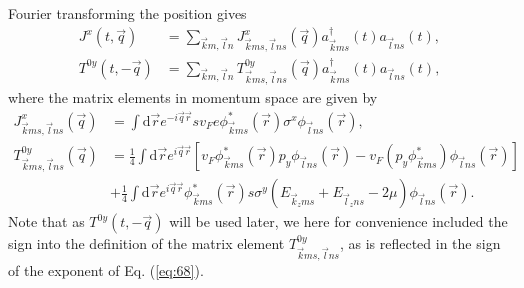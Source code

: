 Fourier transforming the position gives
\begin{align}
  \label{eq:66}
  J^x(t, \vec{q}) &= \sum\limits_{\vec{k}m, \vec{l}n}
                    J^x_{\vec{k}ms, \vec{l}ns}(\vec{q})
                    a^{\dagger}_{\vec{k}ms}(t)
                    a_{\vec{l} ns}(t),\\
  \label{eq:67}
  T^{0y}(t, -\vec{q}) &= \sum\limits_{\vec{k}m, \vec{l}n}^{}
                    T^{0y}_{\vec{k}m s, \vec{l}n s}(\vec{q})
                    a^{\dagger}_{\vec{k}m s}(t)
                    a_{\vec{l} n s}(t),
\end{align}
where the matrix elements in momentum space are given by
\begin{align}
  J^x_{\vec{k}ms, \vec{l}ns}(\vec{q}) &=  \int \mathrm{d} \vec{r} e^{-i \vec{q} \vec{r}} s v_F e \phi ^{*}_{\vec{k}ms} (\vec{r}) \sigma ^x \phi _{\vec{l}ns}(\vec{r}),\\
  \label{eq:68}
  T^{0y}_{\vec{k}m s, \vec{l} n s}(\vec{q}) &= \frac{1}{4} \int \mathrm{d}\vec{r} e^{i\vec{q}\vec{r}} \left[
                                                  v_F \phi ^{*}_{\vec{k} m s}(\vec{r})  p_y \phi _{\vec{l} ns} (\vec{r})
                                                  - v_F (p_y \phi ^{*}_{\vec{k}m s}) \phi _{\vec{l} ns }(\vec{r})
                                                  \right]\\
                                             \nonumber &+ \frac{1}{4}
                                                \int \mathrm{d}\vec{r} e^{i\vec{q}\vec{r}}
                                                \phi ^{*}_{\vec{k}m s}(\vec{r}) s \sigma ^y
                                                (E_{\vec{k}_z m s} + E_{\vec{l}_z n  s} - 2 \mu ) \phi _{\vec{l} n  s}(\vec{r}).
\end{align}
Note that as $T^{0y}(t, -\vec{q})$ will be used later, we here for convenience included the sign into the definition of the matrix element  $T^{0y}_{\vec{k}ms, \vec{l}ns}$, as is reflected in the sign of the exponent of Eq. (\ref{eq:68}).

